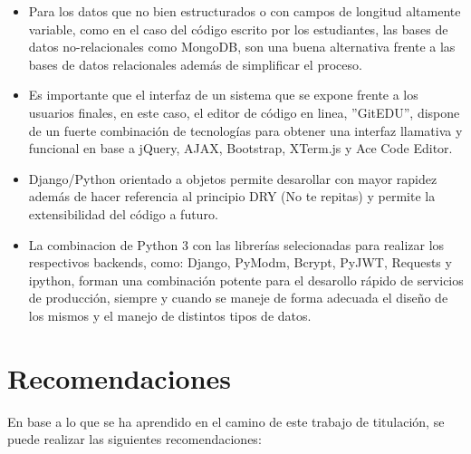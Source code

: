 \begin{itemize}
  \item Para los datos que no bien estructurados o con campos de longitud altamente variable, como en el caso del código escrito por los estudiantes, las bases de datos no-relacionales como MongoDB, son una buena alternativa frente a las bases de datos relacionales además de simplificar el proceso. 
  \item Es importante que el interfaz de un sistema que se expone frente a los usuarios finales, en este caso, el editor de código en linea, ''GitEDU'', dispone de un fuerte combinación de tecnologías para obtener una interfaz llamativa y funcional en base a jQuery, AJAX, Bootstrap, XTerm.js y Ace Code Editor.
  \item Django/Python orientado a objetos permite desarollar con mayor rapidez además de hacer referencia al principio DRY (No te repitas) y permite la extensibilidad del código a futuro. 
  \item La combinacion de Python 3 con las librerías selecionadas para realizar los respectivos backends, como: Django, PyModm, Bcrypt, PyJWT, Requests y ipython, forman una combinación potente para el desarollo rápido de servicios de producción, siempre y cuando se maneje de forma adecuada el diseño de los mismos y el manejo de distintos tipos de datos.
\end{itemize}


\section{Recomendaciones}

En base a lo que se ha aprendido en el camino de este trabajo de titulación, se puede realizar las siguientes recomendaciones:

